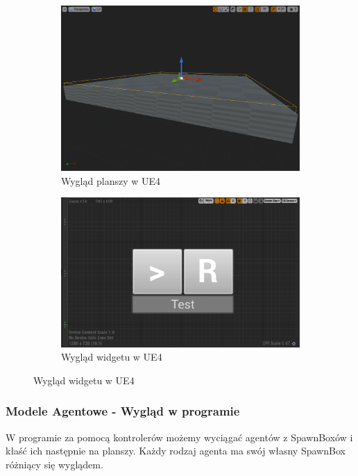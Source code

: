 \documentclass[a4paper,12pt,reqno]{article}
\begin{document}
\begin{figure}[H]%
	\centering
	\begin{subfigure}{.5\textwidth}
		\centering
		\includegraphics[width=0.8\linewidth]{graphics//agent/BP_AgentTable.png}
		\caption{Wygląd planszy w UE4}	
		\label{ref:subref_a}
	\end{subfigure}%
	\begin{subfigure}{.5\textwidth}
		\centering
		\includegraphics[width=0.8\linewidth]{graphics//agent/BP_AgentControl.png}
		\caption{Wygląd widgetu w UE4}
		\label{ref:subref_b}
	\end{subfigure}%
\label{ref:ref}
\end{figure}

\subsubsection{Modele Agentowe - Wygląd w programie}
W programie za pomocą kontrolerów możemy wyciągać agentów z SpawnBoxów i kłaść ich następnie na planszy. Każdy rodzaj agenta ma swój własny SpawnBox różniący się wyglądem.
\end{document}
